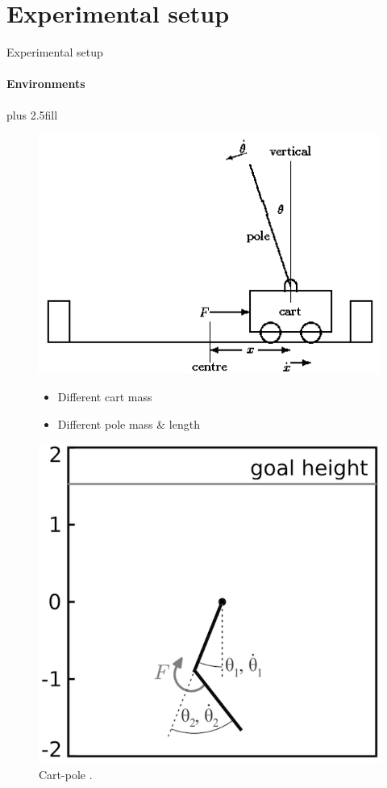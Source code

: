\section{Experimental setup}
\begin{frame}[fragile]{Experimental setup}
\framesubtitle{Environments}
\vskip1.1cm plus 2.5fill
\begin{figure}[htb]
    \begin{minipage}{0.55\textwidth}
            \includegraphics[width=\linewidth]{cartpole.png}
            \caption{Cart-pole \cite{grant1990modelling}.}
            \vskip0.9cm
            \begin{itemize}
                \item Different cart mass
                \item Different pole mass \& length
            \end{itemize}
    \end{minipage}\hfill
    \begin{minipage}{0.45\textwidth}
            \includegraphics[width=\linewidth]{acrobot.png}

\end{minipage}
\end{figure}
\end{frame}
